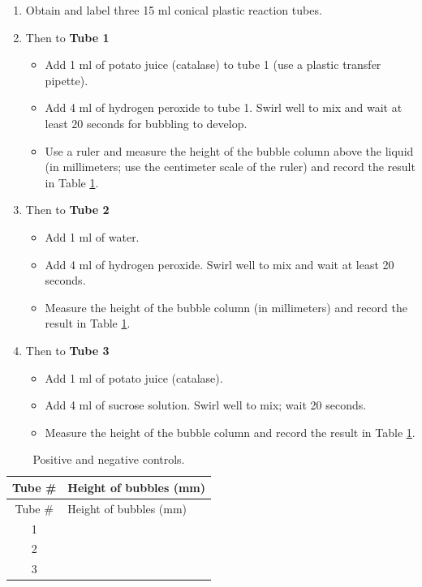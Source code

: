\begin{enumerate}
\def\labelenumi{\arabic{enumi}.}
\tightlist
\item
  Obtain and label three 15 ml conical plastic reaction tubes.
\item
  Then to \textbf{Tube 1}

  \begin{itemize}
  \tightlist
  \item
    Add 1 ml of potato juice (catalase) to tube 1 (use a plastic
    transfer pipette).
  \item
    Add 4 ml of hydrogen peroxide to tube 1. Swirl well to mix and wait
    at least 20 seconds for bubbling to develop.
  \item
    Use a ruler and measure the height of the bubble column above the
    liquid (in millimeters; use the centimeter scale of the ruler) and
    record the result in Table \ref{tab:control}.
  \end{itemize}
\item
  Then to \textbf{Tube 2}

  \begin{itemize}
  \tightlist
  \item
    Add 1 ml of water.
  \item
    Add 4 ml of hydrogen peroxide. Swirl well to mix and wait at least
    20 seconds.
  \item
    Measure the height of the bubble column (in millimeters) and record
    the result in Table \ref{tab:control}.
  \end{itemize}
\item
  Then to \textbf{Tube 3}

  \begin{itemize}
  \tightlist
  \item
    Add 1 ml of potato juice (catalase).
  \item
    Add 4 ml of sucrose solution. Swirl well to mix; wait 20 seconds.
  \item
    Measure the height of the bubble column and record the result in
    Table \ref{tab:control}.
  \end{itemize}
\end{enumerate}

\begin{longtable}[]{@{}cl@{}}
\caption{\label{tab:control} Positive and negative controls.}\tabularnewline
\toprule
Tube \# & Height of bubbles (mm)\tabularnewline
\midrule
\endfirsthead
\toprule
Tube \# & Height of bubbles (mm)\tabularnewline
\midrule
\endhead
1 &\tabularnewline
2 &\tabularnewline
3 &\tabularnewline
\bottomrule
\end{longtable}

